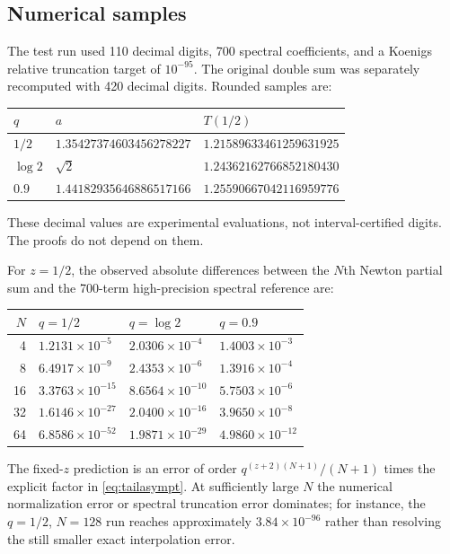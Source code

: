 \documentclass[11pt,letterpaper]{article}
\theoremstyle{definition}\newtheorem{definition}[theorem]{Definition}
\theoremstyle{remark}\newtheorem{remark}[theorem]{Remark}
\numberwithin{equation}{section}
\begin{document}
\subsection{Numerical samples}
The test run used 110 decimal digits, 700 spectral coefficients, and a Koenigs relative truncation target of $10^{-95}$. The original double sum was separately recomputed with 420 decimal digits. Rounded samples are:
\begin{center}
\begin{tabular}{@{}lll@{}}
\toprule
$q$ & $a$ & $T(1/2)$\\
\midrule
$1/2$ & $1.35427374603456278227$ & $1.21589633461259631925$\\
$\log2$ & $\sqrt2$ & $1.24362162766852180430$\\
$0.9$ & $1.44182935646886517166$ & $1.25590667042116959776$\\
\bottomrule
\end{tabular}
\end{center}
These decimal values are experimental evaluations, not interval-certified digits. The proofs do not depend on them.

For $z=1/2$, the observed absolute differences between the $N$th Newton partial sum and the 700-term high-precision spectral reference are:
\begin{center}
\begin{tabular}{@{}rlll@{}}
\toprule
$N$ & $q=1/2$ & $q=\log2$ & $q=0.9$\\
\midrule
4 & $1.2131\times10^{-5}$ & $2.0306\times10^{-4}$ & $1.4003\times10^{-3}$ \\
8 & $6.4917\times10^{-9}$ & $2.4353\times10^{-6}$ & $1.3916\times10^{-4}$ \\
16 & $3.3763\times10^{-15}$ & $8.6564\times10^{-10}$ & $5.7503\times10^{-6}$ \\
32 & $1.6146\times10^{-27}$ & $2.0400\times10^{-16}$ & $3.9650\times10^{-8}$ \\
64 & $6.8586\times10^{-52}$ & $1.9871\times10^{-29}$ & $4.9860\times10^{-12}$ \\
\bottomrule
\end{tabular}
\end{center}
The fixed-$z$ prediction is an error of order $q^{(z+2)(N+1)}/(N+1)$ times the explicit factor in \eqref{eq:tailasympt}. At sufficiently large $N$ the numerical normalization error or spectral truncation error dominates; for instance, the $q=1/2$, $N=128$ run reaches approximately $3.84\times10^{-96}$ rather than resolving the still smaller exact interpolation error.
\end{document}
